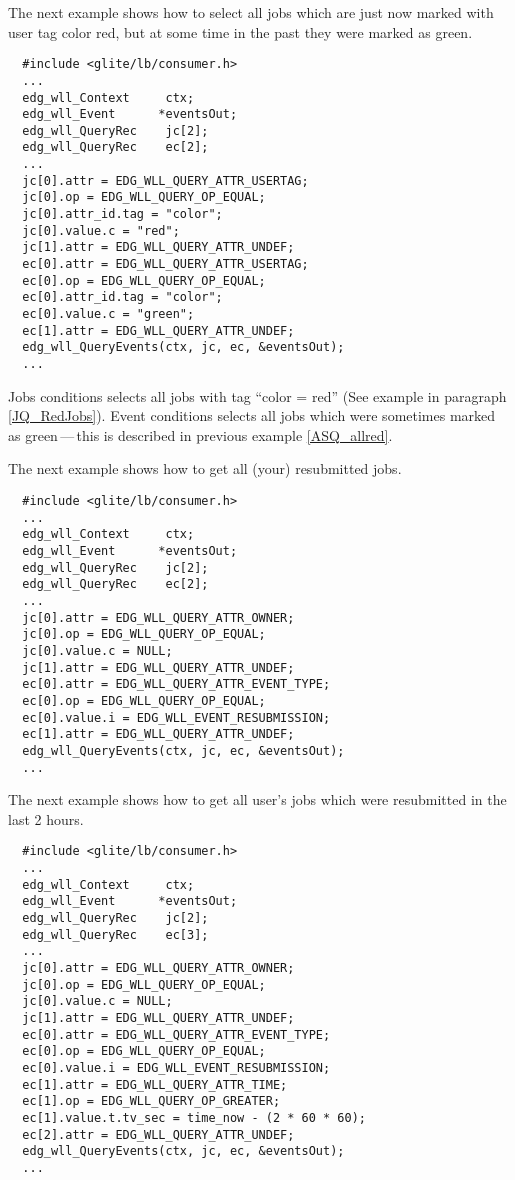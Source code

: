 The next example shows how to select all jobs which are just now marked with
user tag color red, but at some time in the past they were marked as green.
\begin{verbatim}
  #include <glite/lb/consumer.h>
  ...
  edg_wll_Context     ctx;    
  edg_wll_Event      *eventsOut;
  edg_wll_QueryRec    jc[2];
  edg_wll_QueryRec    ec[2];
  ...
  jc[0].attr = EDG_WLL_QUERY_ATTR_USERTAG;
  jc[0].op = EDG_WLL_QUERY_OP_EQUAL;
  jc[0].attr_id.tag = "color";
  jc[0].value.c = "red";
  jc[1].attr = EDG_WLL_QUERY_ATTR_UNDEF;
  ec[0].attr = EDG_WLL_QUERY_ATTR_USERTAG;
  ec[0].op = EDG_WLL_QUERY_OP_EQUAL;
  ec[0].attr_id.tag = "color";
  ec[0].value.c = "green";
  ec[1].attr = EDG_WLL_QUERY_ATTR_UNDEF;
  edg_wll_QueryEvents(ctx, jc, ec, &eventsOut);
  ...
\end{verbatim}

Jobs conditions selects all jobs with tag ``color = red'' (See example in paragraph
\ref{JQ_RedJobs}). Event conditions selects all jobs which were sometimes marked
as green\,---\,this is described in previous example \ref{ASQ_allred}.

The next example shows how to get all (your) resubmitted jobs.
\begin{verbatim}
  #include <glite/lb/consumer.h>
  ...
  edg_wll_Context     ctx;    
  edg_wll_Event      *eventsOut;
  edg_wll_QueryRec    jc[2];
  edg_wll_QueryRec    ec[2];
  ...
  jc[0].attr = EDG_WLL_QUERY_ATTR_OWNER;
  jc[0].op = EDG_WLL_QUERY_OP_EQUAL;
  jc[0].value.c = NULL;
  jc[1].attr = EDG_WLL_QUERY_ATTR_UNDEF;
  ec[0].attr = EDG_WLL_QUERY_ATTR_EVENT_TYPE;
  ec[0].op = EDG_WLL_QUERY_OP_EQUAL;
  ec[0].value.i = EDG_WLL_EVENT_RESUBMISSION;
  ec[1].attr = EDG_WLL_QUERY_ATTR_UNDEF;
  edg_wll_QueryEvents(ctx, jc, ec, &eventsOut);
  ...
\end{verbatim}

The next example shows how to get all user's jobs which were resubmitted in the last
2 hours.
\begin{verbatim}
  #include <glite/lb/consumer.h>
  ...
  edg_wll_Context     ctx;    
  edg_wll_Event      *eventsOut;
  edg_wll_QueryRec    jc[2];
  edg_wll_QueryRec    ec[3];
  ...
  jc[0].attr = EDG_WLL_QUERY_ATTR_OWNER;
  jc[0].op = EDG_WLL_QUERY_OP_EQUAL;
  jc[0].value.c = NULL;
  jc[1].attr = EDG_WLL_QUERY_ATTR_UNDEF;
  ec[0].attr = EDG_WLL_QUERY_ATTR_EVENT_TYPE;
  ec[0].op = EDG_WLL_QUERY_OP_EQUAL;
  ec[0].value.i = EDG_WLL_EVENT_RESUBMISSION;
  ec[1].attr = EDG_WLL_QUERY_ATTR_TIME;
  ec[1].op = EDG_WLL_QUERY_OP_GREATER;
  ec[1].value.t.tv_sec = time_now - (2 * 60 * 60);
  ec[2].attr = EDG_WLL_QUERY_ATTR_UNDEF;
  edg_wll_QueryEvents(ctx, jc, ec, &eventsOut);
  ...
\end{verbatim}


